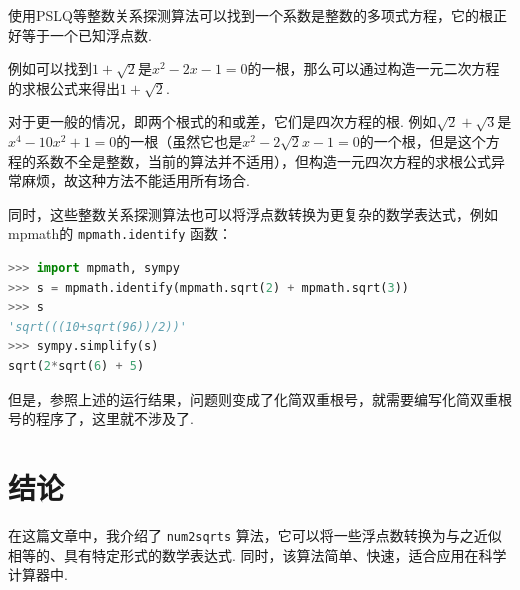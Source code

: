 \documentclass[a4paper, UTF8]{ctexart}
\begin{document}
使用PSLQ\cite{ferguson1991}等整数关系探测算法可以找到一个系数是整数的多项式方程，它的根正好等于一个已知浮点数.

例如可以找到$1+\sqrt{2}$是$x^2-2x-1=0$的一根，那么可以通过构造一元二次方程的求根公式来得出$1+\sqrt{2}$.

对于更一般的情况，即两个根式的和或差，它们是四次方程的根. 例如$\sqrt{2}+\sqrt{3}$是$x^4-10x^2+1=0$的一根（虽然它也是$x^2-2\sqrt{2}x-1=0$的一个根，但是这个方程的系数不全是整数，当前的算法并不适用），但构造一元四次方程的求根公式异常麻烦，故这种方法不能适用所有场合.

同时，这些整数关系探测算法也可以将浮点数转换为更复杂的数学表达式，例如mpmath\cite{mpmath}的 \verb|mpmath.identify| 函数：
\begin{lstlisting}[language=python, numbers=none]
>>> import mpmath, sympy
>>> s = mpmath.identify(mpmath.sqrt(2) + mpmath.sqrt(3))
>>> s
'sqrt(((10+sqrt(96))/2))'
>>> sympy.simplify(s)
sqrt(2*sqrt(6) + 5)
\end{lstlisting}
但是，参照上述的运行结果，问题则变成了化简双重根号，就需要编写化简双重根号的程序了，这里就不涉及了.

\section{结论}
在这篇文章中，我介绍了 \verb|num2sqrts| 算法，它可以将一些浮点数转换为与之近似相等的、具有特定形式的数学表达式. 同时，该算法简单、快速，适合应用在科学计算器中.

\printbibliography[title={参考文献}]
\end{document}
